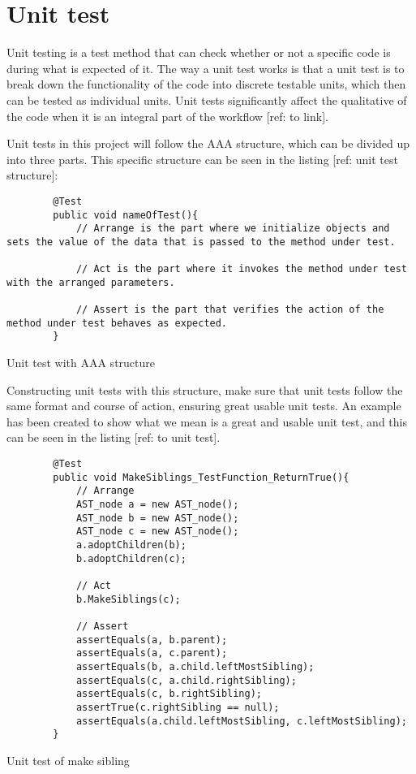 \section{Unit test}\label{subsec:unittest}

Unit testing is a test method that can check whether or not a specific code is during what is expected of it. The way a unit test works is that a unit test is to break down the functionality of the code into discrete testable units, which then can be tested as individual units. Unit tests significantly affect the qualitative of the code when it is an integral part of the workflow [ref: to link].

Unit tests in this project will follow the AAA structure, which can be divided up into three parts. This specific structure can be seen in the listing [ref: unit test structure]:

\begin{listing}[htb!]
    \begin{verbatim}
        @Test
        public void nameOfTest(){
            // Arrange is the part where we initialize objects and sets the value of the data that is passed to the method under test.

            // Act is the part where it invokes the method under test with the arranged parameters.

            // Assert is the part that verifies the action of the method under test behaves as expected. 
        }
    \end{verbatim}
    \caption{Unit test with AAA structure}
    \label{lst:unit test with aaa structure}
\end{listing}

Constructing unit tests with this structure, make sure that unit tests follow the same format and course of action, ensuring great usable unit tests. An example has been created to show what we mean is a great and usable unit test, and this can be seen in the listing [ref: to unit test].

\begin{listing}[htb!]
    \begin{verbatim}
        @Test
        public void MakeSiblings_TestFunction_ReturnTrue(){
            // Arrange
            AST_node a = new AST_node();
            AST_node b = new AST_node();
            AST_node c = new AST_node();
            a.adoptChildren(b);
            b.adoptChildren(c);

            // Act
            b.MakeSiblings(c);

            // Assert
            assertEquals(a, b.parent);
            assertEquals(a, c.parent);
            assertEquals(b, a.child.leftMostSibling);
            assertEquals(c, a.child.rightSibling);
            assertEquals(c, b.rightSibling);
            assertTrue(c.rightSibling == null);
            assertEquals(a.child.leftMostSibling, c.leftMostSibling);
        }
    \end{verbatim}
    \caption{Unit test of make sibling}
    \label{lst:unit test of make sibling}
\end{listing}

